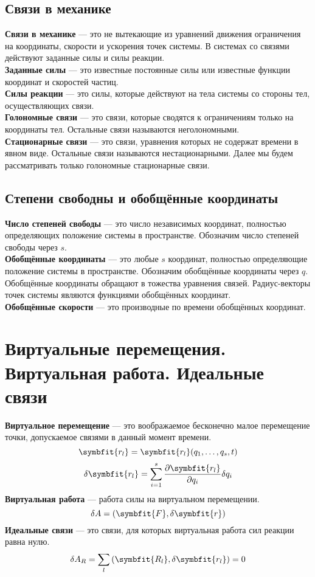 \documentclass[fleqn,a4paper,12pt,titlepage,finall]{article}
\newcommand\vv[1]{\symbfit{#1}}
\begin{document}
\subsection{Связи в механике}
{\bf Связи в механике} --- это не вытекающие из уравнений движения ограничения
на координаты, скорости и ускорения точек системы. В системах со связями
действуют заданные силы и силы реакции. \\
{\bf Заданные силы} --- это известные постоянные силы или известные функции
координат и скоростей частиц. \\
{\bf Силы реакции} --- это силы, которые действуют на тела системы со стороны
тел, осуществляющих связи. \\
{\bf Голономные связи} --- это связи, которые сводятся к ограничениям только на
координаты тел. Остальные связи называются неголономными. \\
{\bf Стационарные связи} --- это связи, уравнения которых не содержат времени в
явном виде. Остальные связи называются нестационарными. Далее мы будем
рассматривать только голономные стационарные связи. \\
\subsection{Степени свободны и обобщённые координаты}
{\bf Число степеней свободы} --- это число независимых координат, полностью
определяющих положение системы в пространстве. Обозначим число степеней свободы
через $s$.\\
{\bf Обобщённые координаты} --- это любые $s$ координат, полностью определяющие
положение системы в пространстве. Обозначим обобщённые координаты через ${q}$.
Обобщённые координаты обращают в тожества уравнения связей. Радиус-векторы точек
системы являются функциями обобщённых координат. \\
{\bf Обобщённые скорости} --- это производные по времени обобщённых координат.\\

\section{Виртуальные перемещения. Виртуальная работа. Идеальные связи}
{\bf Виртуальное перемещение} --- это воображаемое бесконечно малое перемещение
точки, допускаемое связями в данный момент времени.
\[\vv{r_l} = \vv{r_l}(q_1,\dots,q_s, t)\]
\[\delta\vv{r_l} = \sum_{i=1}^s\frac{\partial\vv{r_l}}{\partial q_i}\delta q_i\]
{\bf Виртуальная работа} --- работа силы на виртуальном перемещении.
\[\delta A = \left(\vv{F}, \delta\vv{r}\right)\]
{\bf Идеальные связи} --- это связи, для которых виртуальная работа сил реакции
равна нулю.
\[\delta A_R = \sum_l\left(\vv{R_l}, \delta\vv{r_l}\right) = 0\]
\end{document}
